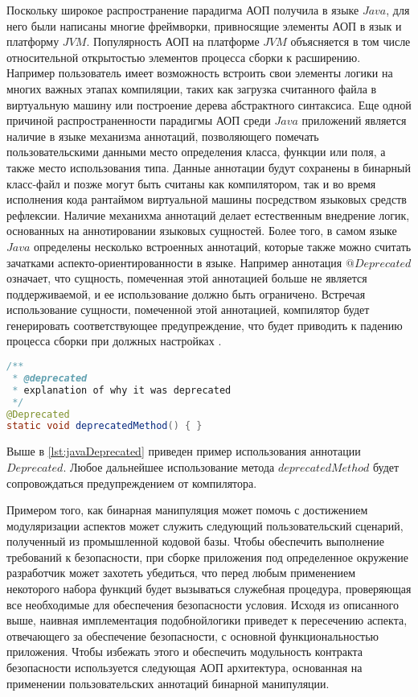 Поскольку широкое распространение парадигма АОП получила в языке $Java$, для него были написаны многие фреймворки, привносящие элементы АОП в язык и платформу $JVM$. Популярность АОП на платформе $JVM$ объясняется в том числе относительной открытостью элементов процесса сборки к расширению. Например пользователь имеет возможность встроить свои элементы логики на многих важных этапах компиляции, таких как загрузка считанного файла в виртуальную машину или построение дерева абстрактного синтаксиса. Еще одной причиной распространенности парадигмы АОП среди $Java$ приложений является наличие в языке механизма аннотаций, позволяющего помечать пользовательскими данными место определения класса, функции или поля, а также место использования типа. Данные аннотации будут сохранены в бинарный класс-файл и позже могут быть считаны как компилятором, так и во время исполнения кода рантаймом виртуальной машины посредством языковых средств рефлексии. Наличие механихма аннотаций делает естественным внедрение логик, основанных на аннотировании языковых сущностей. Более того, в самом языке $Java$ определены несколько встроенных аннотаций, которые также можно считать зачатками аспекто-ориентированности в языке. Например аннотация $@Deprecated$ означает, что сущность, помеченная этой аннотацией больше не является поддерживаемой, и ее использование должно быть ограничено. Встречая использование сущности, помеченной этой аннотацией, компилятор будет генерировать соответствующее предупреждение, что будет приводить к падению процесса сборки при должных настройках \cite{javaAnnotations}.

\begin{lstlisting}[language=Java, caption=Пример использования аннотации $Deprecated$, label=lst:javaDeprecated]
/**
 * @deprecated
 * explanation of why it was deprecated
 */
@Deprecated
static void deprecatedMethod() { }
\end{lstlisting}

Выше в \autoref{lst:javaDeprecated} приведен пример использования аннотации $Deprecated$. Любое дальнейшее использование метода $deprecatedMethod$ будет сопровождаться предупреждением от компилятора.

Примером того, как бинарная манипуляция может помочь с достижением модуляризации аспектов может служить следующий пользовательский сценарий, полученный из промышленной кодовой базы. Чтобы обеспечить выполнение требований к безопасности, при сборке приложения под определенное окружение разработчик может захотеть убедиться, что перед любым применением некоторого набора функций будет вызываться служебная процедура, проверяющая все необходимые для обеспечения безопасности условия. Исходя из описанного выше, наивная имплементация подобнойлогики приведет к пересечению аспекта, отвечающего за обеспечение безопасности, с основной функциональностью приложения. Чтобы избежать этого и обеспечить модульность контракта безопасности используется следующая АОП архитектура, основанная на применении пользовательских аннотаций бинарной манипуляции.

